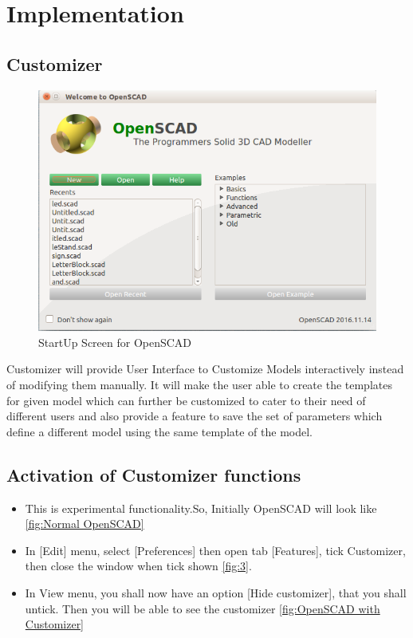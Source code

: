 \section{Implementation}
\subsection{Customizer}

\begin{figure}[H]
    \centering \includegraphics[scale=0.40]{images/output/1.png}
    \caption{StartUp Screen for OpenSCAD}
    \label{fig:1}
\end{figure}

Customizer  will provide User Interface to Customize Models interactively instead of modifying them manually. It will make the user able to create the templates for given model which can further be customized to cater to their need of different users and also provide a feature to save the set of parameters which define a different model using the same template of the model.
\subsection{Activation of Customizer functions}
\begin{itemize}
   
    \item This is experimental functionality.So, Initially
    OpenSCAD will look like \ref{fig:Normal OpenSCAD}
    \item In [Edit] menu, select [Preferences] then open tab [Features], tick Customizer, then close the window when tick shown \ref{fig:3}.
    \item In View menu, you shall now have an option [Hide customizer], that you shall untick. Then you will be able to see the customizer \ref{fig:OpenSCAD with Customizer}
   
\end{itemize}

